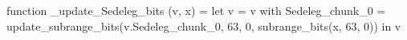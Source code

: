 function _update_Sedeleg_bits (v, x) = let v = { v with Sedeleg_chunk_0 = update_subrange_bits(v.Sedeleg_chunk_0, 63, 0, subrange_bits(x, 63, 0)) } in
  v
